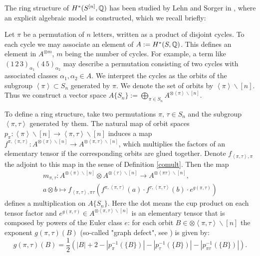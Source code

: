 The ring structure of $H^\ast(S^{[n]}, \mathbb{Q})$ has been studied by Lehn and Sorger in \cite{LehnSorger}, where an explicit algebraic model is constructed, which we recall briefly:
\begin{definition} \label{model}\cite[Sect. 2]{LehnSorger}
Let $\pi$ be a permutation of $n$ letters, written as a product of disjoint cycles. To each cycle we may associate an element of $A:=H^\ast(S,\mathbb{Q})$. This defines an element in $A^{\otimes m}$, $m$ being the number of cycles. For example, a term like $(1\,2\,3)_{\alpha_1}(4\,5)_{\alpha_2}$ may describe a permutation consisting of two cycles with associated classes $\alpha_1,\alpha_2\in A$. We interpret the cycles as the orbits of the subgroup $\left<\pi\right>\subset S_n$ generated by $\pi$. We denote the set of orbits by $\left<\pi\right>\backslash[n]$. Thus we construct a vector space $A\{S_n\}:=\bigoplus_{\pi\in S_n} A^{\otimes\left<\pi\right>\backslash[n]}$. 

To define a ring structure, take two permutations $\pi,\,\tau \in S_n$ and the subgroup $\left< \pi,\tau\right>$ generated by them. The natural map of orbit spaces
$
p_\pi:\left<\pi\right>\backslash[n] \rightarrow \left<\pi,\tau\right>\backslash[n]
$
induces a map $f^{\pi,\left<\pi,\tau\right>} : A^{\otimes\left<\pi\right>\backslash[n]} \rightarrow A^{\otimes\left<\pi,\tau\right>\backslash[n]}$, which multiplies the factors of an elementary tensor if the corresponding orbits are glued together.
Denote $f_{\left<\pi,\tau\right>,\pi} $ the adjoint to this map in the sense of Definition \ref{comult}. Then the map
\begin{gather*}
m_{\pi,\tau} : A^{\otimes\left<\pi\right>\backslash[n]} \otimes A^{\otimes\left<\tau\right>\backslash[n]} \longrightarrow A^{\otimes\left<\pi\tau\right>\backslash[n]} ,  \\
a\otimes b \longmapsto  f_{\left<\pi,\tau\right>,\pi\tau} (f^{\pi,\left<\pi,\tau\right>} (a)\cdot f^{\tau,\left<\pi,\tau\right>}(b)\cdot  e^{g(\pi,\tau)} ) 
\end{gather*}
defines a multiplication on $A\{S_n\}$. Here the dot means the cup product on each tensor factor and $e^{g(\pi,\tau)} \in A^{\otimes\left<\pi,\tau\right>\backslash[n]}$ is an elementary tensor that is composed by powers of the Euler class $e$: for each orbit $B \in  {\otimes\left<\pi,\tau\right>\backslash[n]}$ the exponent $g(\pi,\tau)(B)$ (so-called "graph defect", see \cite[2.6]{LehnSorger}) is given by:
$$
g(\pi,\tau)(B) = \frac{1}{2}\left( |B| +2 - |p_\pi^{-1}(\{B\})|- |p_\tau^{-1}(\{B\})| - |p_{\pi\tau}^{-1}(\{B\})|  \right).
$$

\end{definition}
